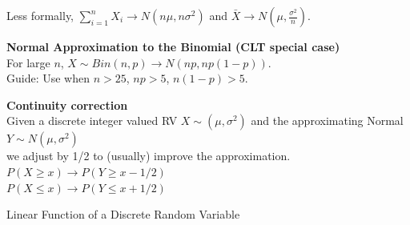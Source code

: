 \documentclass[bigtut]{tutorial}\usepackage[]{graphicx}\usepackage[]{color}
\begin{document}
\begin{tutorial}
\begin{displaybox}
Less formally,  
$ \sum_{i=1}^{n} X_i \rightarrow   N(  n \mu, n \sigma^2 )$ 
and  $ \bar{X} \rightarrow   N(  \mu,  \frac{ \sigma^2}{n} )$.  

\end{displaybox}


\begin{displaybox}
{\bf Normal Approximation to the Binomial (CLT special case)} \\

For large $n$, $X \sim Bin(n,p) \rightarrow N(np, np(1-p))$. \\ 

Guide: Use when $n > 25$, $np >5$, $n(1-p) > 5$.
\end{displaybox}

\begin{displaybox}
{\bf Continuity correction} \\

Given a discrete integer valued RV $X \sim (\mu, \sigma^2)$ and the approximating Normal $Y \sim N(\mu, \sigma^2)$ \\
we adjust by 1/2 to (usually) improve the approximation. \\
$ P(X \geq x) \rightarrow P(Y \geq x-1/2) $ \\
$ P(X \leq x) \rightarrow P(Y \leq x+1/2) $

\end{displaybox}


\begin{questions}

\vspace{.5cm}
\question Linear Function of a Discrete Random Variable  \\

\end{questions}
\end{tutorial}
\end{document}
